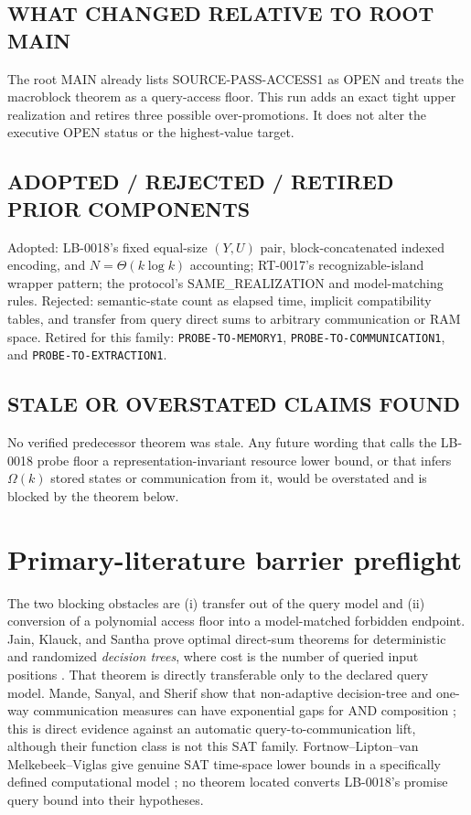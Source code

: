 \documentclass[11pt]{article}
\begin{document}
\subsection*{WHAT CHANGED RELATIVE TO ROOT MAIN}
The root MAIN already lists SOURCE-PASS-ACCESS1 as OPEN and treats the
macroblock theorem as a query-access floor.  This run adds an exact tight
upper realization and retires three possible over-promotions.  It does not
alter the executive OPEN status or the highest-value target.

\subsection*{ADOPTED / REJECTED / RETIRED PRIOR COMPONENTS}
Adopted: LB-0018's fixed equal-size $(Y,U)$ pair, block-concatenated indexed
encoding, and $N=\Theta(k\log k)$ accounting; RT-0017's recognizable-island
wrapper pattern; the protocol's SAME\_REALIZATION and model-matching rules.
Rejected: semantic-state count as elapsed time, implicit compatibility tables,
and transfer from query direct sums to arbitrary communication or RAM space.
Retired for this family: \texttt{PROBE-TO-MEMORY1},
\texttt{PROBE-TO-COMMUNICATION1}, and
\texttt{PROBE-TO-EXTRACTION1}.

\subsection*{STALE OR OVERSTATED CLAIMS FOUND}
No verified predecessor theorem was stale.  Any future wording that calls the
LB-0018 probe floor a representation-invariant resource lower bound, or that
infers $\Omega(k)$ stored states or communication from it, would be overstated
and is blocked by the theorem below.

\section{Primary-literature barrier preflight}

The two blocking obstacles are (i) transfer out of the query model and (ii)
conversion of a polynomial access floor into a model-matched forbidden
endpoint.  Jain, Klauck, and Santha prove optimal direct-sum theorems for
deterministic and randomized \emph{decision trees}, where cost is the number
of queried input positions \cite{JKS2010}.  That theorem is directly
transferable only to the declared query model.  Mande, Sanyal, and Sherif show
that non-adaptive decision-tree and one-way communication measures can have
exponential gaps for AND composition \cite{MSS2021}; this is direct evidence
against an automatic query-to-communication lift, although their function
class is not this SAT family.  Fortnow--Lipton--van Melkebeek--Viglas give
genuine SAT time-space lower bounds in a specifically defined computational
model \cite{FLMV2005}; no theorem located converts LB-0018's promise query
bound into their hypotheses.
\end{document}
